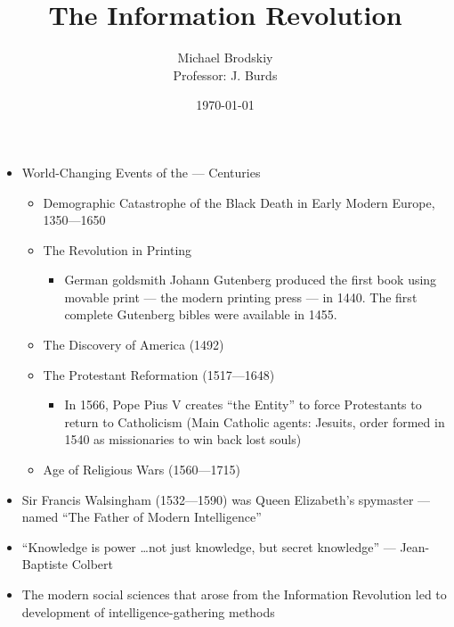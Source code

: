 

\title{The Information Revolution}
\date{\today}
\author{Michael Brodskiy\\ \small Professor: J. Burds}



\maketitle

\begin{itemize}

  \item World-Changing Events of the — Centuries

    \begin{itemize}

      \item Demographic Catastrophe of the Black Death in Early Modern Europe, 1350—1650

      \item The Revolution in Printing

        \begin{itemize}

          \item German goldsmith Johann Gutenberg produced the first book using movable print — the modern printing press — in 1440. The first complete Gutenberg bibles were available in 1455.

        \end{itemize}

      \item The Discovery of America (1492)

      \item The Protestant Reformation (1517—1648)

        \begin{itemize}

          \item In 1566, Pope Pius V creates ``the Entity'' to force Protestants to return to Catholicism (Main Catholic agents: Jesuits, order formed in 1540 as missionaries to win back lost souls)

        \end{itemize}

      \item Age of Religious Wars (1560—1715)

    \end{itemize}

  \item Sir Francis Walsingham (1532—1590) was Queen Elizabeth's spymaster — named ``The Father of Modern Intelligence''

  \item ``Knowledge is power \ldots not just knowledge, but secret knowledge'' — Jean-Baptiste Colbert

  \item The modern social sciences that arose from the Information Revolution led to development of intelligence-gathering methods

\end{itemize}



